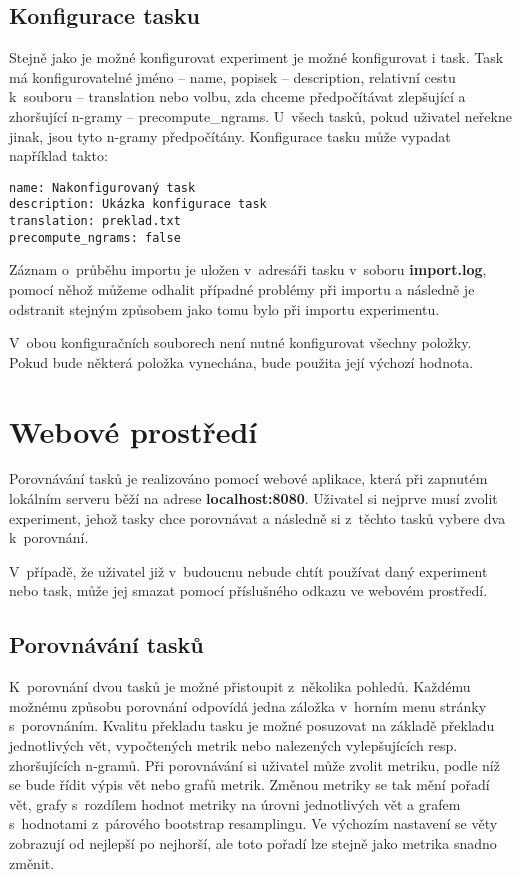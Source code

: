 \subsection{Konfigurace tasku}
Stejně jako je možné konfigurovat experiment je možné konfigurovat i task.
Task má konfigurovatelné jméno -- name, popisek -- description,
  relativní cestu k~souboru -- translation nebo volbu,
  zda chceme předpočítávat zlepšující a zhoršující \mbox{n-gramy} -- precompute\_ngrams.
U~všech tasků, pokud uživatel neřekne jinak, 
  jsou tyto \mbox{n-gramy} předpočítány.
Konfigurace tasku může vypadat například takto:

\begin{verbatim}
name: Nakonfigurovaný task
description: Ukázka konfigurace task
translation: preklad.txt
precompute_ngrams: false
\end{verbatim}

Záznam o~průběhu importu je uložen v~adresáři tasku v~soboru \textbf{import.log},
  pomocí něhož můžeme odhalit případné problémy při importu
  a následně je odstranit stejným způsobem jako tomu bylo při importu experimentu.

V~obou konfiguračních souborech není nutné konfigurovat všechny položky.
Pokud bude některá položka vynechána,
  bude použita její výchozí hodnota. 

\section{Webové prostředí}
Porovnávání tasků je realizováno pomocí webové aplikace,
  která při zapnutém lokálním serveru běží na adrese \textbf{localhost:8080}.
Uživatel si nejprve musí zvolit experiment,
  jehož tasky chce porovnávat a následně si z~těchto tasků vybere dva k~porovnání.

V~případě,
  že uživatel již v~budoucnu nebude chtít používat daný experiment nebo task,
  může jej smazat pomocí příslušného odkazu ve webovém prostředí.

\subsection{Porovnávání tasků}
K~porovnání dvou tasků je možné přistoupit z~několika pohledů.
Každému možnému způsobu porovnání odpovídá jedna záložka v~horním menu stránky s~porovnáním.
Kvalitu překladu tasku je možné posuzovat na základě překladu jednotlivých vět,
  vypočtených metrik nebo nalezených vylepšujících resp. zhoršujících \mbox{n-gramů}.
Při porovnávání si uživatel může zvolit metriku,
  podle níž se bude řídit výpis vět nebo grafů metrik.
Změnou metriky se tak mění pořadí vět,
  grafy s~rozdílem hodnot metriky na úrovni jednotlivých vět
  a grafem s~hodnotami z~párového bootstrap resamplingu.
Ve výchozím nastavení se věty zobrazují od nejlepší po nejhorší,
  ale toto pořadí lze stejně jako metrika snadno změnit.

